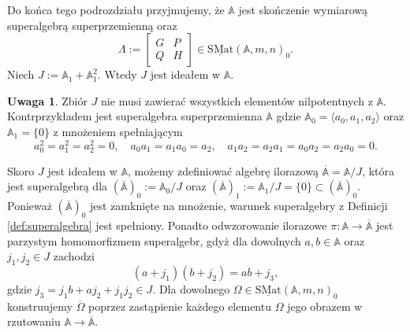 \documentclass[11pt,a4paper]{report}
\theoremstyle{definition}
\newtheorem{remark}[theorem]{Uwaga}
\begin{document}
Do końca tego podrozdziału przyjmujemy, że $\mathbb{A}$ jest skończenie wymiarową superalgebrą superprzemienną oraz
\begin{equation*}
\Lambda := \begin{bmatrix}
      G & P \\
      Q & H
     \end{bmatrix} \in \underline{\mathrm{SMat}}(\mathbb{A},m,n)_0.
\end{equation*}
 Niech $J := \mathbb{A}_1 + \mathbb{A}_1^2$. Wtedy $J$ jest ideałem w $\mathbb{A}$.
\begin{remark}
 Zbiór $J$ nie musi zawierać wszystkich elementów nilpotentnych z $\mathbb{A}$. Kontrprzykładem jest superalgebra superprzemienna $\mathbb{A}$ gdzie $\mathbb{A}_0 = \langle a_0, a_1, a_2 \rangle$ oraz $\mathbb{A}_1 = \{ 0 \}$ z mnożeniem spełniającym
 \begin{equation*}
  a_0^2=a_1^2=a_2^2=0, \quad a_0 a_1 = a_1 a_0 = a_2, \quad a_1 a_2 = a_2 a_1 = a_0 a_2 = a_2 a_0 = 0.
 \end{equation*}
\end{remark}
 Skoro $J$ jest ideałem w $\mathbb{A}$, możemy zdefiniować algebrę ilorazową $\overline{\mathbb{A}} = \mathbb{A}/J$, która jest superalgebrą dla
 $(\overline{\mathbb{A}})_0 := \mathbb{A}_0 / J$ oraz $(\overline{\mathbb{A}})_1 := \mathbb{A}_1 / J = \{ 0 \} \subset (\overline{\mathbb{A}})_0.$ Ponieważ $(\overline{\mathbb{A}})_0$ jest zamknięte na mnożenie, warunek superalgebry z Definicji \ref{def:superalgebra}  jest spełniony. Ponadto odwzorowanie ilorazowe $\pi: \mathbb{A} \rightarrow \overline{\mathbb{A}}$ jest parzystym homomorfizmem superalgebr, gdyż dla dowolnych $a,b \in \mathbb{A}$ oraz $j_1, j_2 \in J$ zachodzi
 $$ (a+j_1)(b+j_2) = ab + j_3,$$
 gdzie $j_3 = j_1 b + a j_2 + j_1 j_2 \in J$.
 Dla dowolnego $\Omega \in \underline{\mathrm{SMat}}(\mathbb{A},m,n)_0$ konstruujemy $\overline{\Omega}$ poprzez zastąpienie każdego elementu $\Omega$ jego obrazem w rzutowaniu $\mathbb{A} \rightarrow \overline{\mathbb{A}}$.
 
\end{document}
